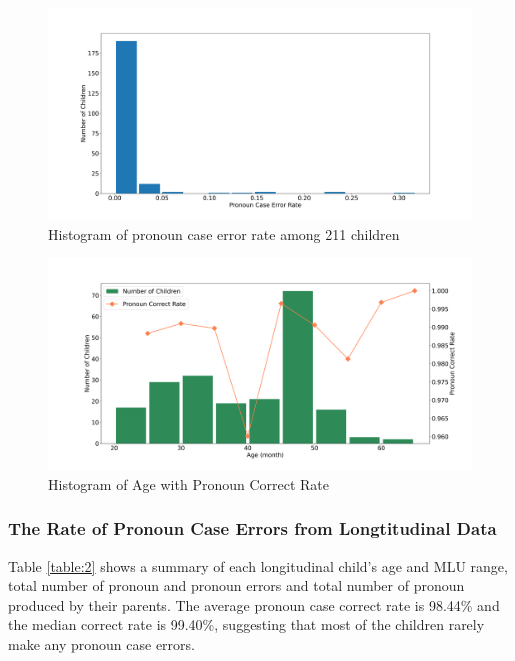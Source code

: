 \FloatBarrier
\begin{figure}[h]
\centering
\includegraphics[scale = 0.35]{graph/OverallErrorRate.png}
\vspace{-3em}
\caption{Histogram of pronoun case error rate among 211 children}
\label{fig:212}
\end{figure}
\FloatBarrier
\begin{figure}[h]
\centering
    \includegraphics[scale =0.35] {graph/Crosssectional.png}
    \vspace{-3em}
    \caption{Histogram of Age with Pronoun Correct Rate}
    \label{fig:cross}
\end{figure}
\subsubsection{The Rate of Pronoun Case Errors from Longtitudinal Data}
Table \ref{table:2} shows a summary of each longitudinal child's age and MLU range, total number of pronoun and pronoun errors and total number of pronoun produced by their parents. The average pronoun case correct rate is 98.44\% and the median correct rate is 99.40\%, suggesting that most of the children rarely make any pronoun case errors. 

